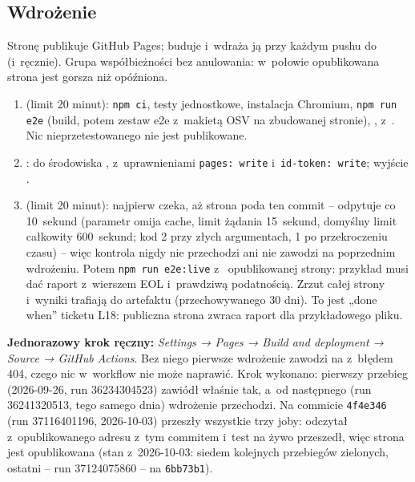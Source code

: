 \subsection{Wdrożenie}\label{sec:risk-scan-deploy}

Stronę publikuje GitHub Pages; buduje i~wdraża ją  przy
każdym pushu do  (i~ręcznie). Grupa współbieżności  bez
anulowania: w~połowie opublikowana strona jest gorsza niż opóźniona.

\begin{enumerate}
  \item \textbf{} (limit 20 minut): \texttt{npm ci}, testy jednostkowe,
        instalacja Chromium, \texttt{npm run e2e} (build, potem zestaw e2e z~makietą OSV na
        zbudowanej stronie), ,
         z~. Nic nieprzetestowanego nie
        jest publikowane.
  \item \textbf{}:  do środowiska
        , z~uprawnieniami \texttt{pages: write}
        i~\texttt{id-token: write}; wyjście .
  \item \textbf{} (limit 20 minut): najpierw
         czeka, aż strona poda ten commit -- odpytuje
         co 10~sekund (parametr  omija cache, limit
        żądania 15~sekund, domyślny limit całkowity 600~sekund; kod 2 przy złych argumentach,
        1 po przekroczeniu czasu) -- więc kontrola nigdy nie przechodzi ani nie zawodzi na
        poprzednim wdrożeniu. Potem \texttt{npm run e2e:live} z~
        opublikowanej strony: przykład musi dać raport z~wierszem EOL i~prawdziwą podatnością.
        Zrzut całej strony i~wyniki trafiają do artefaktu 
        (przechowywanego 30 dni). To jest „done when” ticketu L18: publiczna strona zwraca
        raport dla przykładowego pliku.
\end{enumerate}

\textbf{Jednorazowy krok ręczny:} \emph{Settings → Pages → Build and deployment → Source →
GitHub Actions}. Bez niego pierwsze wdrożenie zawodzi na  z~błędem
404, czego nic w~workflow nie może naprawić. Krok wykonano: pierwszy przebieg (2026-09-26,
run 36234304523) zawiódł właśnie tak, a~od następnego (run 36241320513, tego samego dnia)
wdrożenie przechodzi. Na commicie \texttt{4f4e346} (run 37116401196, 2026-10-03) przeszły
wszystkie trzy joby:  odczytał z~opublikowanego adresu 
z~tym commitem i~test na żywo przeszedł, więc strona jest opublikowana (stan z~2026-10-03:
siedem kolejnych przebiegów zielonych, ostatni -- run 37124075860 -- na \texttt{6bb73b1}).

